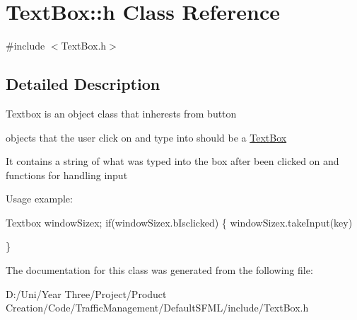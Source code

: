 \hypertarget{class_text_box_1_1h}{}\section{Text\+Box\+:\+:h Class Reference}
\label{class_text_box_1_1h}


{\ttfamily \#include $<$Text\+Box.\+h$>$}



\subsection{Detailed Description}
Textbox is an object class that inherests from button

objects that the user click on and type into should be a \hyperlink{class_text_box}{Text\+Box}

It contains a string of what was typed into the box after been clicked on and functions for handling input

Usage example\+: 
\begin{DoxyCode}
Textbox windowSizex;
\textcolor{keywordflow}{if}(windowSizex.bIsclicked)
\{
    windowSizex.takeInput(key)

\}
\end{DoxyCode}
 

The documentation for this class was generated from the following file\+:\begin{DoxyCompactItemize}
\item 
D\+:/\+Uni/\+Year Three/\+Project/\+Product Creation/\+Code/\+Traffic\+Management/\+Default\+S\+F\+M\+L/include/Text\+Box.\+h\end{DoxyCompactItemize}
